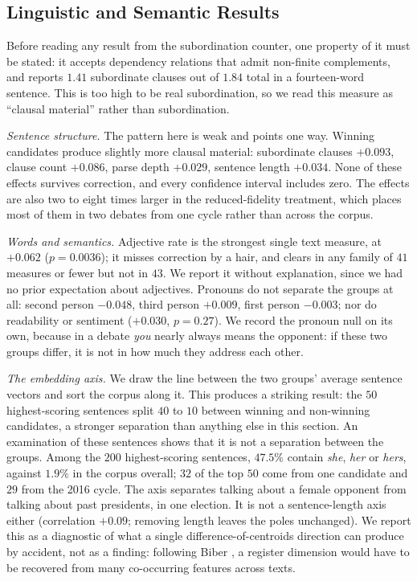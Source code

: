 \documentclass[journal]{IEEEtran}
\begin{document}
\subsection{Linguistic and Semantic Results}
\label{sec:method:linguistic}

Before reading any result from the subordination counter, one property of it
must be stated: it accepts dependency relations that admit non-finite
complements, and reports $1.41$ subordinate clauses out of $1.84$ total in a
fourteen-word sentence. This is too high to be real subordination, so we
read this measure as ``clausal material'' rather than subordination.

\emph{Sentence structure.} The pattern here is weak and points one way.
Winning candidates produce slightly more clausal material: subordinate
clauses $+0.093$, clause count $+0.086$, parse depth $+0.029$, sentence
length $+0.034$. None of these effects survives correction, and every
confidence interval includes zero. The effects are also two to eight times
larger in the reduced-fidelity treatment, which places most of them in two
debates from one cycle rather than across the corpus.

\emph{Words and semantics.} Adjective rate is the strongest single text
measure, at $+0.062$ ($p = 0.0036$); it misses correction by a hair, and
clears in any family of $41$ measures or fewer but not in $43$. We report it
without explanation, since we had no prior expectation about adjectives.
Pronouns do not separate the groups at all: second person $-0.048$, third
person $+0.009$, first person $-0.003$; nor do readability or sentiment
($+0.030$, $p = 0.27$). We record the pronoun null on its own, because in a
debate \emph{you} nearly always means the opponent: if these two groups
differ, it is not in how much they address each other.

\emph{The embedding axis.} We draw the line between the two groups' average
sentence vectors and sort the corpus along it. This produces a striking
result: the $50$ highest-scoring sentences split $40$ to $10$ between
winning and non-winning candidates, a stronger separation than anything else
in this section. An examination of these sentences shows that it is not a
separation between the groups. Among the $200$ highest-scoring sentences,
$47.5\%$ contain \emph{she}, \emph{her} or \emph{hers}, against $1.9\%$ in
the corpus overall; $32$ of the top $50$ come from one candidate and $29$
from the 2016 cycle. The axis separates talking about a female opponent from
talking about past presidents, in one election. It is not a sentence-length
axis either (correlation $+0.09$; removing length leaves the poles
unchanged). We report this as a diagnostic of what a single
difference-of-centroids direction can produce by accident, not as a finding:
following Biber \cite{biber1988variation}, a register dimension would have
to be recovered from many co-occurring features across texts.
\end{document}
